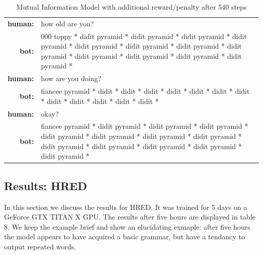 \documentclass[letterpaper]{article}
\begin{document}
\begin{table}[bt!]
    \centering
    \small
    \caption{\small Mutual Information Model with additional reward/penalty after 540 steps}
    \begin{tabularx}{0.48\textwidth}{rX}
        \hline \hline
        \textbf{human:} & how old are you?    \\
        \textbf{bot:} & 000 toppy * didit pyramid * didit pyramid * didit pyramid * didit pyramid * didit pyramid * didit pyramid * didit pyramid * didit pyramid * didit pyramid * didit pyramid * didit pyramid * didit pyramid *\\
        \textbf{human:} & how are you doing? \\
        \textbf{bot:} & fiancee pyramid * didit * didit * didit * didit * didit * didit * didit * didit * didit * didit * didit * didit *\\
        \textbf{human:} & okay? \\
        \textbf{bot:} & fiancee pyramid * didit pyramid * didit pyramid * didit pyramid * didit pyramid * didit pyramid * didit pyramid * didit pyramid * didit pyramid * didit pyramid * didit pyramid * didit pyramid * didit pyramid * \\
        \hline \hline    
    \end{tabularx}
    \label{table:mi_03}
\end{table}


\subsection{Results: HRED}

In this section we discuss the results for HRED. It was trained for 5 days on a GeForce GTX TITAN X GPU. The results after five hours are displayed in table 8. We keep the example brief and show an elucidating exmaple: after five hours the model appears to have acquired a basic grammar, but have a tendancy to output repeated words. 

\end{document}
